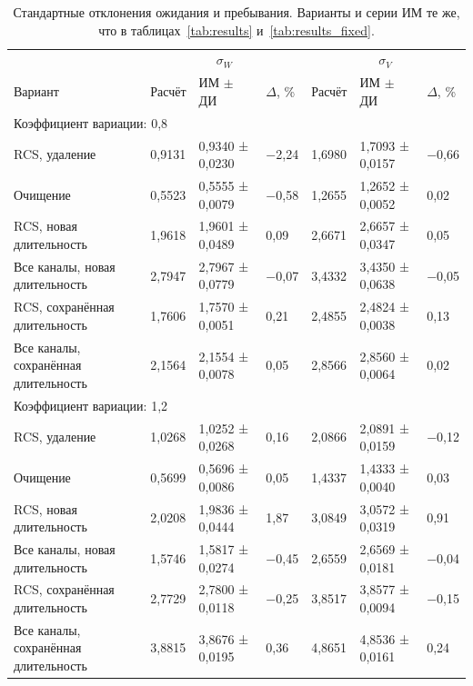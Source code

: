 \documentclass[a4paper,12pt]{article}
\begin{document}
\begin{table}[!htbp]
\centering\small\setlength{\tabcolsep}{2pt}
\begin{tabular}{@{}p{4.16cm}p{1.61cm}p{2.83cm}p{1.28cm}p{1.61cm}p{2.83cm}p{1.28cm}@{}}
\toprule
 & \multicolumn{3}{c}{$\sigma_W$} & \multicolumn{3}{c}{$\sigma_V$} \\
Вариант & Расчёт & ИМ $\pm$ ДИ & $\Delta$, \% & Расчёт & ИМ $\pm$ ДИ & $\Delta$, \% \\
\midrule
\multicolumn{7}{l}{Коэффициент вариации: 0,8} \\
RCS, удаление & 0,9131 & 0,9340 ± 0,0230 & −2,24 & 1,6980 & 1,7093 ± 0,0157 & −0,66 \\
Очищение & 0,5523 & 0,5555 ± 0,0079 & −0,58 & 1,2655 & 1,2652 ± 0,0052 & 0,02 \\
RCS, новая длительность & 1,9618 & 1,9601 ± 0,0489 & 0,09 & 2,6671 & 2,6657 ± 0,0347 & 0,05 \\
Все каналы, новая длительность & 2,7947 & 2,7967 ± 0,0779 & −0,07 & 3,4332 & 3,4350 ± 0,0638 & −0,05 \\
RCS, сохранённая длительность & 1,7606 & 1,7570 ± 0,0051 & 0,21 & 2,4855 & 2,4824 ± 0,0038 & 0,13 \\
Все каналы, сохранённая длительность & 2,1564 & 2,1554 ± 0,0078 & 0,05 & 2,8566 & 2,8560 ± 0,0064 & 0,02 \\
\multicolumn{7}{l}{Коэффициент вариации: 1,2} \\
RCS, удаление & 1,0268 & 1,0252 ± 0,0268 & 0,16 & 2,0866 & 2,0891 ± 0,0159 & −0,12 \\
Очищение & 0,5699 & 0,5696 ± 0,0086 & 0,05 & 1,4337 & 1,4333 ± 0,0040 & 0,03 \\
RCS, новая длительность & 2,0208 & 1,9836 ± 0,0444 & 1,87 & 3,0849 & 3,0572 ± 0,0319 & 0,91 \\
Все каналы, новая длительность & 1,5746 & 1,5817 ± 0,0274 & −0,45 & 2,6559 & 2,6569 ± 0,0181 & −0,04 \\
RCS, сохранённая длительность & 2,7729 & 2,7800 ± 0,0118 & −0,25 & 3,8517 & 3,8577 ± 0,0094 & −0,15 \\
Все каналы, сохранённая длительность & 3,8815 & 3,8676 ± 0,0195 & 0,36 & 4,8651 & 4,8536 ± 0,0161 & 0,24 \\
\bottomrule
\end{tabular}
\caption{Стандартные отклонения ожидания и пребывания. Варианты и серии ИМ те же, что в таблицах~\ref{tab:results} и~\ref{tab:results_fixed}.}
\label{tab:sd}
\end{table}
\end{document}

